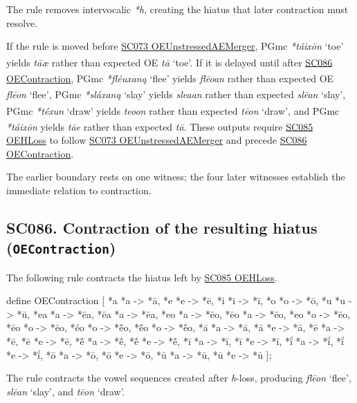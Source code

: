 \documentclass[
  british,
  a4paper,
  openany]{book}
\providecommand{\Pred}[1]{\textsuperscript{\dag}\emph{#1}}
\providecommand{\Recon}[1]{\emph{*#1}}
{\catcode`→=\active \global\def→{\ensuremath{\rightarrow}}}
\providecommand{\texorpdfstring}[2]{#1}
\providecommand{\Pred}[1]{\textsuperscript{\dag}\emph{#1}}
\providecommand{\Recon}[1]{\emph{*#1}}
{\catcode`→=\active \global\def→{\ensuremath{\rightarrow}}}
\begin{document}
The rule removes intervocalic \emph{*h}, creating the hiatus that later
contraction must resolve.

If the rule is moved before \hyperref[rule-OEUnstressedAEMerger]{SC073
OEUnstressedAEMerger}, PGmc \Recon{táixōn} `toe' yields \Pred{tāæ}
rather than expected OE \emph{tā} `toe'. If it is delayed until after
\hyperref[rule-OEContraction]{SC086 OEContraction}, PGmc
\Recon{fléuxaną} `flee' yields \Pred{flēoan} rather than expected OE
\emph{flēon} `flee', PGmc \Recon{sláxaną} `slay' yields \Pred{sleaan}
rather than expected \emph{slēan} `slay', PGmc \Recon{téxun} `draw'
yields \Pred{teoon} rather than expected \emph{tēon} `draw', and PGmc
\Recon{táixōn} yields \Pred{tāe} rather than expected \emph{tā}. These
outputs require \hyperref[rule-OEHLoss]{SC085 OEHLoss} to follow
\hyperref[rule-OEUnstressedAEMerger]{SC073 OEUnstressedAEMerger} and
precede \hyperref[rule-OEContraction]{SC086 OEContraction}.

The earlier boundary rests on one witness; the four later witnesses
establish the immediate relation to contraction.

\subsection{\texorpdfstring{SC086. Contraction of the resulting hiatus
(\texttt{OEContraction})}{SC086. Contraction of the resulting hiatus (OEContraction)}}\label{rule-OEContraction}

The following rule contracts the hiatus left by
\hyperref[rule-OEHLoss]{SC085 OEHLoss}.

\begin{ReaderFacingFoma}
define OEContraction [
    {*a} {*a} -> {*ā},
    {*e} {*e} -> {*ē},
    {*i} {*i} -> {*ī},
    {*o} {*o} -> {*ō},
    {*u} {*u} -> {*ū},
    {*ea} {*a} -> {*ēa},
    {*ēa} {*a} -> {*ēa},
    {*eo} {*a} -> {*ēo},
    {*ēo} {*a} -> {*ēo},
    {*eo} {*o} -> {*ēo},
    {*ēo} {*o} -> {*ēo},
    {*éo} {*o} -> {*ḗo},
    {*ḗo} {*o} -> {*ḗo},
    {*ā} {*a} -> {*ā},
    {*ā} {*e} -> {*ā},
    {*ē} {*a} -> {*ē},
    {*ē} {*e} -> {*ē},
    {*ḗ} {*a} -> {*ḗ},
    {*ḗ} {*e} -> {*ḗ},
    {*ī} {*a} -> {*ī},
    {*ī} {*e} -> {*ī},
    {*ḯ} {*a} -> {*ḯ},
    {*ḯ} {*e} -> {*ḯ},
    {*ō} {*a} -> {*ō},
    {*ō} {*e} -> {*ō},
    {*ū} {*a} -> {*ū},
    {*ū} {*e} -> {*ū}
];
\end{ReaderFacingFoma}

The rule contracts the vowel sequences created after \emph{h}-loss,
producing \emph{flēon} `flee', \emph{slēan} `slay', and \emph{tēon}
`draw'.
\end{document}

